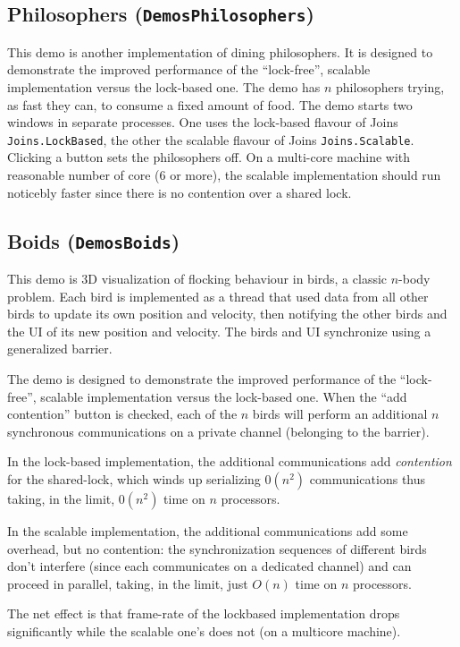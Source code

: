 \documentclass{article}
\newcommand{\demo}[1]{\texorpdfstring{{(\texttt{Demos{\symbol{92}}#1})}}{}}
\begin{document}
\subsection{Philosophers \demo{Philosophers}}

This demo is another implementation of dining philosophers. It is
designed to demonstrate the improved performance of the ``lock-free'',
scalable implementation versus the lock-based one.  The demo has $n$
philosophers trying, as fast they can, to consume a fixed amount of
food. The demo starts two windows in separate processes. One uses the
lock-based flavour of Joins \lstinline{Joins.LockBased}, the other the
scalable flavour of Joins \lstinline{Joins.Scalable}.  Clicking a
button sets the philosophers off. On a multi-core machine with reasonable number of core (6 or more), the
scalable implementation should run noticebly faster since there is no
contention over a shared lock.

\subsection{Boids \demo{Boids}}

This demo is 3D visualization of flocking behaviour in birds, a classic $n$-body problem.
Each bird is implemented as a thread that used data from all other birds to update its own position and velocity, then
notifying the other birds and the UI of its new position and velocity. The birds and UI synchronize using a generalized barrier.

The demo is designed to demonstrate the improved performance of the ``lock-free'',
scalable implementation versus the lock-based one. When the ``add contention'' button is checked, 
each  of the $n$ birds will perform an additional $n$  synchronous communications on a private channel (belonging to the barrier).

In the lock-based implementation, the additional communications add \emph{contention} for the shared-lock, which winds up serializing $0(n^2)$ communications thus taking, in the limit, 
$0(n^2)$ time on $n$ processors.

In the scalable implementation, the additional communications add some overhead, but no contention: the synchronization sequences of different birds
don't interfere (since each communicates on a dedicated channel) and can proceed in parallel, taking, in the limit, just $O(n)$ time on $n$ processors.

The net effect is that frame-rate of the lockbased implementation drops significantly while the scalable one's does not (on a multicore machine).
\end{document}
